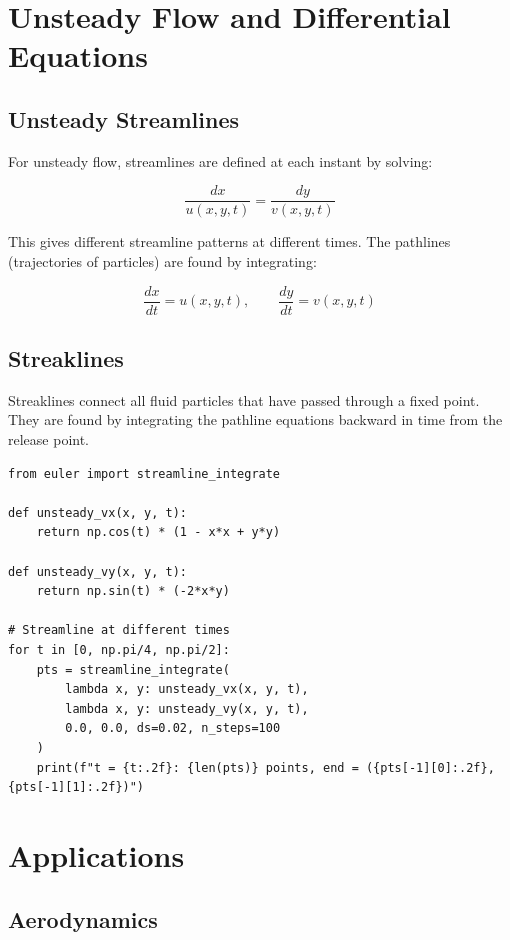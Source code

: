 \section{Unsteady Flow and Differential Equations}

\subsection{Unsteady Streamlines}

For unsteady flow, streamlines are defined at each instant by solving:

\[
\frac{dx}{u(x,y,t)} = \frac{dy}{v(x,y,t)}
\]

This gives different streamline patterns at different times. The pathlines (trajectories of particles) are found by integrating:

\[
\frac{dx}{dt} = u(x,y,t), \qquad \frac{dy}{dt} = v(x,y,t)
\]

\subsection{Streaklines}

Streaklines connect all fluid particles that have passed through a fixed point. They are found by integrating the pathline equations backward in time from the release point.

\begin{lstlisting}[caption={Unsteady streamline computation}, label=lst:unsteady]
from euler import streamline_integrate

def unsteady_vx(x, y, t):
    return np.cos(t) * (1 - x*x + y*y)

def unsteady_vy(x, y, t):
    return np.sin(t) * (-2*x*y)

# Streamline at different times
for t in [0, np.pi/4, np.pi/2]:
    pts = streamline_integrate(
        lambda x, y: unsteady_vx(x, y, t),
        lambda x, y: unsteady_vy(x, y, t),
        0.0, 0.0, ds=0.02, n_steps=100
    )
    print(f"t = {t:.2f}: {len(pts)} points, end = ({pts[-1][0]:.2f}, {pts[-1][1]:.2f})")
\end{lstlisting}

\section{Applications}

\subsection{Aerodynamics}

